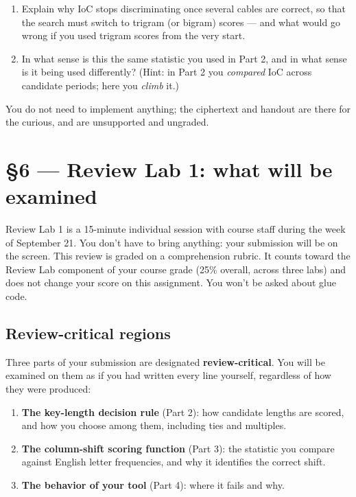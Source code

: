 \documentclass[11pt]{article}
\begin{document}
\begin{enumerate}
\begin{enumerate}[label=(\alph*)]
  \item Explain why IoC stops discriminating once several cables are correct, so that the search must switch to trigram (or bigram) scores --- and what would go wrong if you used trigram scores from the very start.
  \item In what sense is this the same statistic you used in Part 2, and in what sense is it being used differently? (Hint: in Part 2 you \emph{compared} IoC across candidate periods; here you \emph{climb} it.)
  \end{enumerate}
  You do not need to implement anything; the ciphertext and handout are there for the curious, and are unsupported and ungraded.
\end{enumerate}

\section*{\S6 --- Review Lab 1: what will be examined}

Review Lab 1 is a 15-minute individual session with course staff during the week of September 21. You don't have to bring anything: your submission will be on the screen. This review is graded on a comprehension rubric. It counts toward the Review Lab component of your course grade (25\% overall, across three labs) and does not change your score on this assignment. You won't be asked about glue code.

\subsection*{Review-critical regions}
Three parts of your submission are designated \textbf{review-critical}. You will be examined on them as if you had written every line yourself, regardless of how they were produced:
\medskip \noindent
\begin{enumerate}
\item \textbf{The key-length decision rule} (Part 2): how candidate lengths are scored, and how you choose among them, including ties and multiples.
\item \textbf{The column-shift scoring function} (Part 3): the statistic you compare against English letter frequencies, and why it identifies the correct shift.
\item \textbf{The behavior of your tool} (Part 4): where it fails and why.
\end{enumerate}
\end{document}
